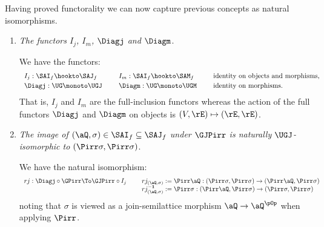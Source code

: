 \documentclass{article}
\begin{document}
\smallskip
Having proved functorality we can now capture previous concepts as natural isomorphisms.
\smallskip

\begin{definition}
\label{def:nat_isos_involving_diagonals}
\item
\begin{enumerate}
\item
\emph{The functors $I_j$, $I_m$, $\Diagj$ and $\Diagm$}.

\smallskip
We have the functors:
\[
\begin{tabular}{lllll}
$I_j : \SAI_f \hookto \SAJ_f$
&&
$I_m : \SAI_f \hookto \SAM_f$
&&
identity on objects and morphisms,
\\[0.5ex]
$\Diagj : \UG \monoto \UGJ$
&&
$\Diagm : \UG \monoto \UGM$
&&
identity on morphisms.
\end{tabular}
\]
That is, $I_j$ and $I_m$ are the full-inclusion functors whereas the action of the full functors $\Diagj$ and $\Diagm$ on objects is $(V,\rE) \mapsto (\rE,\rE)$.

\item
\emph{The image of $(\aQ,\sigma) \in \SAI_f \subseteq \SAJ_f$ under $\GJPirr$ is naturally $\UGJ$-isomorphic to $(\Pirr\sigma,\Pirr\sigma)$}.

\smallskip
We have the natural isomorphism:
\[
\begin{tabular}{lllllll}
$rj : \Diagj \circ \GPirr \To \GJPirr \circ I_j$
&&
$rj_{(\aQ,\sigma)} := \Pirr\aQ : (\Pirr\sigma,\Pirr\sigma) \to (\Pirr\aQ,\Pirr\sigma)$
\\&&
$rj_{(\aQ,\sigma)}^{\bf-1} := \Pirr\sigma : (\Pirr\aQ,\Pirr\sigma) \to (\Pirr\sigma,\Pirr\sigma)$
\end{tabular}
\]
noting that $\sigma$ is viewed as a join-semilattice morphism $\aQ \to \aQ^{\pOp}$ when applying $\Pirr$. \endbox


\end{enumerate}
\end{definition}
\end{document}
